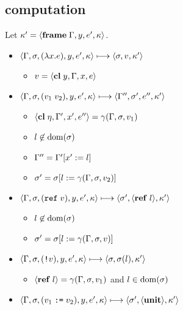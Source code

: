 \documentclass{article}
\begin{document}
\begin{minipage}{\textwidth}
\begin{minipage}[t]{0.50\textwidth}

\subsection{computation}
Let $\kappa' = \langle\mathbf{frame}\; \Gamma,y,e',\kappa\rangle$.

\begin{itemize}
\item $\langle\Gamma,\sigma,(\lambda x.e),y,e',\kappa\rangle \longmapsto \langle \sigma,v, \kappa'\rangle$

\begin{itemize}
\item $v = \langle\mathbf{cl}\; y,\Gamma,x,e\rangle$
\end{itemize}

\item $\langle\Gamma,\sigma,(v_1\;v_2),y,e',\kappa\rangle \longmapsto \langle\Gamma'',\sigma',e'',\kappa'\rangle$

\begin{itemize}
\item $\langle\mathbf{cl}\; \eta,\Gamma',x',e''\rangle=\gamma(\Gamma,\sigma,v_1)$
\item $l\not\in\operatorname{dom}(\sigma)$
\item $\Gamma''=\Gamma'[x':= l]$
\item $\sigma'=\sigma[l:= \gamma(\Gamma,\sigma,v_2)]$
\end{itemize}

\item $\langle\Gamma,\sigma,(\mathtt{ref}\; v),y,e',\kappa\rangle \longmapsto \langle\sigma', \langle\mathbf{ref}\; l\rangle,\kappa'\rangle$

\begin{itemize}
  \item $l\not\in\operatorname{dom}(\sigma)$
  \item $\sigma'=\sigma[l:= \gamma(\Gamma,\sigma,v)]$
\end{itemize}

\item $\langle\Gamma,\sigma,(\text{\texttt{!}}v),y,e',\kappa\rangle \longmapsto \langle\sigma, \sigma(l),\kappa'\rangle$

\begin{itemize}
\item $\langle\mathbf{ref}\; l\rangle=\gamma(\Gamma,\sigma,v_1)$ and $l\in\operatorname{dom}(\sigma)$
\end{itemize}

\item $\langle\Gamma,\sigma,(v_1\; \text{\texttt{:=}}\; v_2),y,e',\kappa\rangle \longmapsto \langle\sigma',\langle\mathbf{unit}\rangle,\kappa'\rangle$


\end{itemize}
\end{minipage}
\end{minipage}
\end{document}
